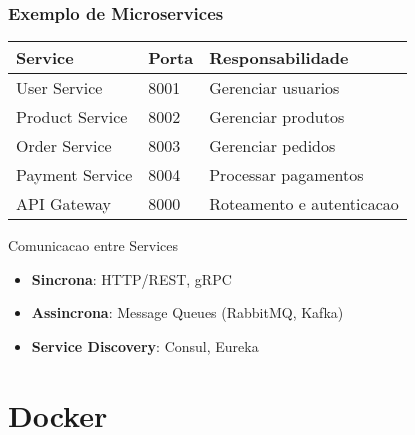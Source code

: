 \documentclass[aspectratio=169]{beamer}
\begin{document}
\begin{frame}
    \frametitle{Exemplo de Microservices}
    \begin{center}
        \begin{tabular}{|l|l|l|}
            \hline
            \textbf{Service} & \textbf{Porta} & \textbf{Responsabilidade} \\
            \hline
            User Service & 8001 & Gerenciar usuarios \\
            \hline
            Product Service & 8002 & Gerenciar produtos \\
            \hline
            Order Service & 8003 & Gerenciar pedidos \\
            \hline
            Payment Service & 8004 & Processar pagamentos \\
            \hline
            API Gateway & 8000 & Roteamento e autenticacao \\
            \hline
        \end{tabular}
    \end{center}
    
    \vspace{1em}
    \begin{exampleblock}{Comunicacao entre Services}
        \begin{itemize}
            \item \textbf{Sincrona}: HTTP/REST, gRPC
            \item \textbf{Assincrona}: Message Queues (RabbitMQ, Kafka)
            \item \textbf{Service Discovery}: Consul, Eureka
        \end{itemize}
    \end{exampleblock}
\end{frame}

\section{Docker}
\end{document}

